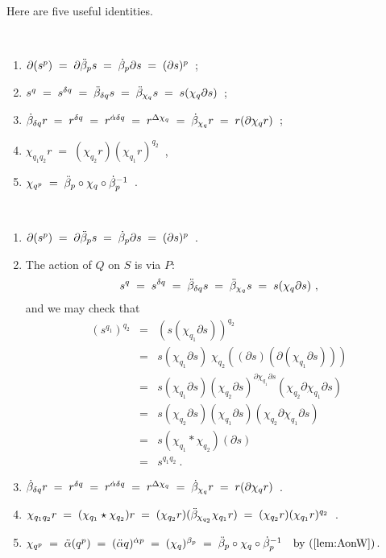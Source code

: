 \bigskip
Here are five useful identities.
\begin{lem} \label{lem:ids5}
\mbox{}\\
\vspace{-5mm}
\begin{enumerate}[{\rm (a)}]
\item
$\partial(s^p) \;=\;
 \partial \ddot{\beta}_p s \;=\;
 \dot{\beta}_p \partial s \;=\;
 (\partial s)^p$~;
\item
$s^q \;=\;
 s^{\delta q} \;=\;
 \ddot{\beta}_{\delta q}s \;=\;
 \ddot{\beta}_{\chi_q}s \;=\;
 s(\chi_q \partial s)$~; 
\item
$\dot{\beta}_{\delta q}r \;=\;
 r^{\delta q} \;=\;
 r^{\dot{\alpha} \delta q} \;=\;
 r^{\Delta \chi_q} \;=\;
 \dot{\beta}_{\chi_q} r \;=\;
 r(\partial\chi_q r)$~;
\item
$\chi_{q_1q_2} r \;=\;
 (\chi_{q_2} r)(\chi_{q_1} r)^{q_2}$~,
\item
$\chi_{q^p} \;=\; \ddot{\beta}_p \circ \chi_q \circ {\dot{\beta}_p}^{-1}$~.
\end{enumerate}
\end{lem}
\begin{pf}
\mbox{}\\
\vspace{-5mm}
\begin{enumerate}[{\rm (a)}]
\item
$\partial(s^p) \;=\;
 \partial \ddot{\beta}_p s \;=\;
 \dot{\beta}_p \partial s \;=\;
 (\partial s)^p$~.
\item
The action of $Q$ on $S$ is via $P$: 
$$
s^q \;=\; s^{\delta q} \;=\; \ddot{\beta}_{\delta q}s 
    \;=\; \ddot{\beta}_{\chi_q}s \;=\; s(\chi_q \partial s)~,
$$
and we may check that
\begin{eqnarray*}
(s^{q_1})^{q_2}
  & = &  (s(\chi_{q_1}\partial s))^{q_2} \\
  & = &  s(\chi_{q_1}\partial s)\; 
          \chi_{q_2}((\partial s)(\partial(\chi_{q_1}\partial s))) \\
  & = &  s(\chi_{q_1}\partial s) 
          (\chi_{q_2}\partial s)^{\partial\chi_{q_1}\partial s}
          (\chi_{q_2}\partial\chi_{q_1}\partial s) \\
  & = &  s(\chi_{q_2}\partial s)(\chi_{q_1}\partial s)
          (\chi_{q_2}\partial\chi_{q_1}\partial s) \\
  & = &  s(\chi_{q_1} \ast \chi_{q_2})(\partial s) \\
  & = &  s^{q_1q_2}~. 
\end{eqnarray*}
\item
$\dot{\beta}_{\delta q}r \;=\;
 r^{\delta q} \;=\;
 r^{\dot{\alpha} \delta q} \;=\;
 r^{\Delta \chi_q} \;=\;
 \dot{\beta}_{\chi_q} r \;=\;
 r(\partial\chi_q r)$~. 
\item
$\chi_{q_1q_2}r \;=\; 
 (\chi_{q_1} \star \chi_{q_2})r \;=\; 
 (\chi_{q_2}r)(\ddot{\beta}_{\chi_{q_2}}\chi_{q_1}r) \;=\; 
 (\chi_{q_2}r)(\chi_{q_1}r)^{q_2}$~. 
\item
$\chi_{q^p} \;=\;
 \ddot{\alpha}(q^p) \;=\;
 (\ddot{\alpha} q)^{\dot{\alpha} p} \;=\;
 (\chi_q)^{\beta_p} \;=\;
 \ddot{\beta}_p \circ \chi_q \circ {\dot{\beta}_p}^{-1}
 \quad\mbox{by (\ref{lem:AonW})}$.
\end{enumerate}
\end{pf}

